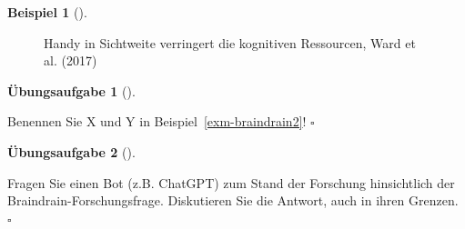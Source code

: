 \documentclass[
  a4paper,
]{scrbook}
\theoremstyle{definition}
\newtheorem{example}{Beispiel}[chapter]
\theoremstyle{definition}
\theoremstyle{definition}
\newtheorem{exercise}{Übungsaufgabe}[chapter]
\theoremstyle{remark}
\begin{document}
\begin{example}[]
\begin{figure}


\caption{\label{fig-braindrain}Handy in Sichtweite verringert die
kognitiven Ressourcen, Ward et al. (2017)}

\end{figure}%

\end{example}

\begin{exercise}[]\protect\hypertarget{exr-braindrain1}{}\label{exr-braindrain1}

Benennen Sie X und Y in Beispiel~\ref{exm-braindrain2}! \(\square\)

\end{exercise}

\begin{exercise}[]\protect\hypertarget{exr-braindrain-chatgpt}{}\label{exr-braindrain-chatgpt}

Fragen Sie einen Bot (z.B. ChatGPT) zum Stand der Forschung hinsichtlich
der Braindrain-Forschungsfrage. Diskutieren Sie die Antwort, auch in
ihren Grenzen. \(\square\)

\end{exercise}
\end{document}
